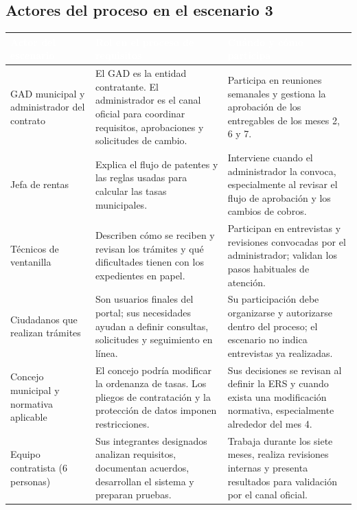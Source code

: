 \subsection{Actores del proceso en el escenario 3}

\begin{center}
\small
\begin{tabularx}{\textwidth}{|L|L|L|}
\hline
{}
\textcolor{white}{\textbf{Actor del escenario}} & \textcolor{white}{\textbf{Rol en el proceso de requisitos}} & \textcolor{white}{\textbf{Cuándo y cómo participa}} \\ \hline
GAD municipal y administrador del contrato &
El GAD es la entidad contratante. El administrador es el canal oficial para coordinar requisitos, aprobaciones y solicitudes de cambio. &
Participa en reuniones semanales y gestiona la aprobación de los entregables de los meses 2, 6 y 7. \\ \hline
Jefa de rentas &
Explica el flujo de patentes y las reglas usadas para calcular las tasas municipales. &
Interviene cuando el administrador la convoca, especialmente al revisar el flujo de aprobación y los cambios de cobros. \\ \hline
Técnicos de ventanilla &
Describen cómo se reciben y revisan los trámites y qué dificultades tienen con los expedientes en papel. &
Participan en entrevistas y revisiones convocadas por el administrador; validan los pasos habituales de atención. \\ \hline
Ciudadanos que realizan trámites &
Son usuarios finales del portal; sus necesidades ayudan a definir consultas, solicitudes y seguimiento en línea. &
Su participación debe organizarse y autorizarse dentro del proceso; el escenario no indica entrevistas ya realizadas. \\ \hline
Concejo municipal y normativa aplicable &
El concejo podría modificar la ordenanza de tasas. Los pliegos de contratación y la protección de datos imponen restricciones. &
Sus decisiones se revisan al definir la ERS y cuando exista una modificación normativa, especialmente alrededor del mes 4. \\ \hline
Equipo contratista (6 personas) &
Sus integrantes designados analizan requisitos, documentan acuerdos, desarrollan el sistema y preparan pruebas. &
Trabaja durante los siete meses, realiza revisiones internas y presenta resultados para validación por el canal oficial. \\ \hline
\end{tabularx}
\end{center}

